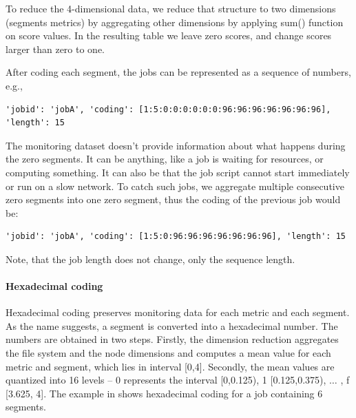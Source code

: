 \documentclass[]{llncs}
\begin{document}





To reduce the 4-dimensional data, we reduce that structure to two dimensions (segments metrics) by aggregating other dimensions by applying sum() function on score values.
In the resulting table we leave zero scores, and change scores larger than zero to one.


After coding each segment, the jobs can be represented as a sequence of numbers, e.g.,

\begin{lstlisting}
'jobid': 'jobA', 'coding': [1:5:0:0:0:0:0:0:96:96:96:96:96:96:96], 'length': 15
\end{lstlisting}


The monitoring dataset doesn't provide information about what happens during the zero segments.
It can be anything, like a job is waiting for resources, or computing something.
It can also be that the job script cannot start immediately or run on a slow network.
To catch such jobs, we aggregate multiple consecutive zero segments into one zero segment, thus the coding of the previous job would be:


\begin{lstlisting}
'jobid': 'jobA', 'coding': [1:5:0:96:96:96:96:96:96:96], 'length': 15
\end{lstlisting}

Note, that the job length does not change, only the sequence length.

\paragraph*{Hexadecimal coding}
Hexadecimal coding preserves monitoring data for each metric and each segment.
As the name suggests, a segment is converted into a hexadecimal number.
The numbers are obtained in two steps.
Firstly, the dimension reduction aggregates the file system and the node dimensions and computes a mean value for each metric and segment, which lies in interval [0,4].
Secondly, the mean values are quantized into 16 levels -- 0 represents the interval [0,0.125), 1 [0.125,0.375), $ \ldots $ , f [3.625, 4].
The example in  shows hexadecimal coding for a job containing 6 segments.
\end{document}
